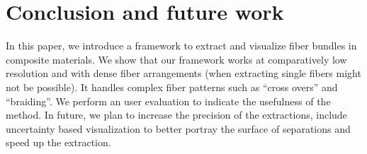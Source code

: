 

\section{Conclusion and future work}
\label{sec:conclusions}
In this paper, we introduce a framework to extract and visualize fiber bundles in composite materials. We show that our framework works at comparatively low resolution and with dense fiber arrangements (when extracting single fibers might not be possible). It handles complex fiber patterns such as ``cross overs'' and ``braiding''. We perform an user evaluation to indicate the usefulness of the method. In future, we plan to increase the precision of the extractions, include uncertainty based visualization to better portray the surface of separations and speed up the extraction.
%


